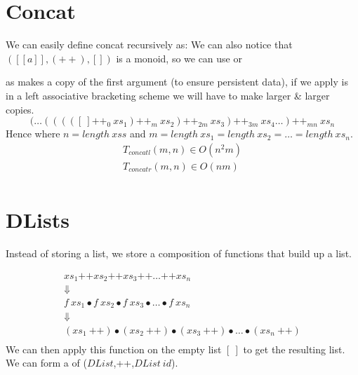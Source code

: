 \documentclass{report}
\begin{document}
\section*{Concat}
We can easily define concat recursively as:
We can also notice that $([[a]], (++), [])$ is a monoid, so we can use  or 
\\\begin{minipage}[t]{0.45\textwidth}
\end{minipage}
\hfill
\begin{minipage}[t]{0.45\textwidth}
\end{minipage}
as \fun{(++)} makes a copy of the first argument (to ensure persistent data), if we apply is in a left associative bracketing scheme we will have to make larger \& larger copies.
\[( \dots (((( [ \ ] \text{++}_{0} \  xs_1) \text{++}_{m} \ xs_2) \text{++}_{2m} \ xs_3) \text{++}_{3m}  \ xs_4 \dots) \text{++}_{mn} \ xs_n\]
Hence where $n = length \ xss$ and $m = length \ xs_1 = length \ xs_2 = \dots = length \ xs_n$.
\[\begin{matrix}
		T_{concatl}(m,n) \in O(n^2m) \\
		T_{concatr}(m,n) \in O(nm)   \\
	\end{matrix}\]

\section*{DLists}
Instead of storing a list, we store a composition of functions that build up a list.

\[ \begin{matrix}
		xs_1 \text{++} xs_2 \text{++} xs_3 \text{++} \dots \text{++} xs_n                                                 \\
		\Downarrow                                                                                                        \\
		f \ xs_1 \bullet f \ xs_2 \bullet f \ xs_3 \bullet \dots \bullet f \ xs_n                                         \\
		\Downarrow                                                                                                        \\
		(xs_1 \ \text{++}) \bullet (xs_2 \ \text{++}) \bullet (xs_3 \ \text{++}) \bullet \dots \bullet (xs_n \ \text{++}) \\
	\end{matrix}\]
We can then apply this function on the empty list $[ \ ]$ to get the resulting list.
We can form a  of ($DList$,++,$DList \ id$).
\end{document}
